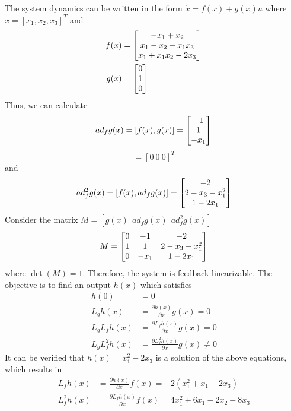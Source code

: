 \documentclass[a4 paper, 12pt]{article}
\begin{document}
The system dynamics can be written in the form $\dot{x} = f(x) + g(x)u$ where $x = [x_1,x_2,x_3]^T$ and 
\begin{align}
        f(x) &= \begin{bmatrix} -x_1+x_2 \\ x_1-x_2-x_1x_3 \\ x_1+x_1x_2-2x_3 \end{bmatrix} \\
        g(x) &= \begin{bmatrix} 0 \\ 1 \\ 0 \end{bmatrix}
\end{align}
Thus, we can calculate
\begin{equation}
        ad_fg(x) = [f(x), g(x)] = \begin{bmatrix} -1 \\ 1 \\ -x_1 \end{bmatrix} \\
\end{equation}
\begin{equation}
        [g(x), ad_fg(x)] = [0 ~0 ~0]^T
\end{equation}
and 
\begin{equation}
        ad_f^2g(x) = [f(x), ad_fg(x)] = \begin{bmatrix} -2 \\ 2-x_3-x_1^2 \\ 1-2x_1 \end{bmatrix}
\end{equation}
Consider the matrix $M = [g(x) ~~ad_fg(x) ~~ad_f^2g(x)]$
\begin{equation}
        M = \begin{bmatrix} 0 &-1 &-2 \\ 1 &1 &2-x_3-x_1^2 \\ 0 &-x_1 &1-2x_1 \end{bmatrix}
\end{equation}
where $\det(M)=1$. Therefore, the system is feedback linearizable. The objective is to find an output $h(x)$ which satisfies 
\begin{align}
        h(0) &= 0 \\
        L_gh(x) &= \frac{\partial{h(x)}}{\partial{x}}g(x) = 0 \\
        L_gL_fh(x) &= \frac{\partial{L_fh(x)}}{\partial{x}}g(x) = 0 \\
        L_gL_f^2h(x) &= \frac{\partial{L_f^2h(x)}}{\partial{x}}g(x) \neq 0
\end{align} 
It can be verified that $h(x) = x_1^2 - 2x_3$ is a solution of the above equations, which results in 
\begin{align}
        L_fh(x) &= \frac{\partial{h(x)}}{\partial{x}}f(x) = -2(x_1^2+x_1-2x_3) \\
        L_f^2h(x) &= \frac{\partial{L_fh(x)}}{\partial{x}}f(x) = 4x_1^2+6x_1-2x_2-8x_3
\end{align}
\end{document}
